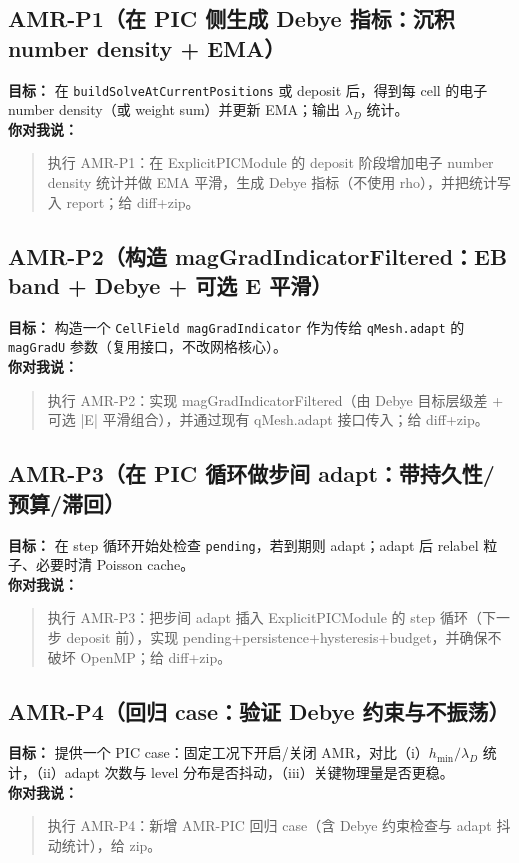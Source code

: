 \documentclass[UTF8,11pt,a4paper]{ctexart}
\begin{document}
\subsection*{AMR-P1（在 PIC 侧生成 Debye 指标：沉积 number density + EMA）}
\textbf{目标：} 在 \texttt{buildSolveAtCurrentPositions} 或 deposit 后，得到每 cell 的电子 number density（或 weight sum）并更新 EMA；输出 $\lambda_D$ 统计。
\\
\textbf{你对我说：}
\begin{quote}
执行 AMR-P1：在 ExplicitPICModule 的 deposit 阶段增加电子 number density 统计并做 EMA 平滑，生成 Debye 指标（不使用 rho），并把统计写入 report；给 diff+zip。
\end{quote}

\subsection*{AMR-P2（构造 magGradIndicatorFiltered：EB band + Debye + 可选 E 平滑）}
\textbf{目标：} 构造一个 \texttt{CellField magGradIndicator} 作为传给 \texttt{qMesh.adapt} 的 \texttt{magGradU} 参数（复用接口，不改网格核心）。
\\
\textbf{你对我说：}
\begin{quote}
执行 AMR-P2：实现 magGradIndicatorFiltered（由 Debye 目标层级差 + 可选 |E| 平滑组合），并通过现有 qMesh.adapt 接口传入；给 diff+zip。
\end{quote}

\subsection*{AMR-P3（在 PIC 循环做步间 adapt：带持久性/预算/滞回）}
\textbf{目标：} 在 step 循环开始处检查 \texttt{pending}，若到期则 adapt；adapt 后 relabel 粒子、必要时清 Poisson cache。
\\
\textbf{你对我说：}
\begin{quote}
执行 AMR-P3：把步间 adapt 插入 ExplicitPICModule 的 step 循环（下一步 deposit 前），实现 pending+persistence+hysteresis+budget，并确保不破坏 OpenMP；给 diff+zip。
\end{quote}

\subsection*{AMR-P4（回归 case：验证 Debye 约束与不振荡）}
\textbf{目标：} 提供一个 PIC case：固定工况下开启/关闭 AMR，对比（i）$h_{\min}/\lambda_D$ 统计，（ii）adapt 次数与 level 分布是否抖动，（iii）关键物理量是否更稳。
\\
\textbf{你对我说：}
\begin{quote}
执行 AMR-P4：新增 AMR-PIC 回归 case（含 Debye 约束检查与 adapt 抖动统计），给 zip。
\end{quote}
\end{document}
